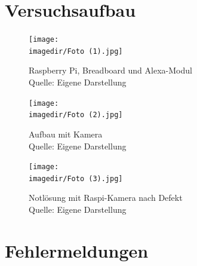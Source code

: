 \chapter{Versuchsaufbau}
\begin{figure}
	\centering 
	
	\texttt{[image: \\imagedir/Foto (1).jpg]}
	\captionsetup{format=hang}
	\caption[Foto Aufbau 1]{\label{}Raspberry Pi, Breadboard und Alexa-Modul\\Quelle: Eigene Darstellung}
\end{figure}
\begin{figure}
	\centering 
	\label{Aufbau2}
	\texttt{[image: \\imagedir/Foto (2).jpg]}
	\captionsetup{format=hang}
	\caption[Foto Aufbau 2]{\label{Aufbauanhang}Aufbau mit Kamera \\Quelle: Eigene Darstellung}
\end{figure}
\begin{figure}
	\centering 
	\label{Aufbau3}
	\texttt{[image: \\imagedir/Foto (3).jpg]}
	\captionsetup{format=hang}
	\caption[Foto Aufbau 3]{\label{}Notlösung mit Raspi-Kamera nach Defekt \\Quelle: Eigene Darstellung}
\end{figure}



\chapter{Fehlermeldungen}
